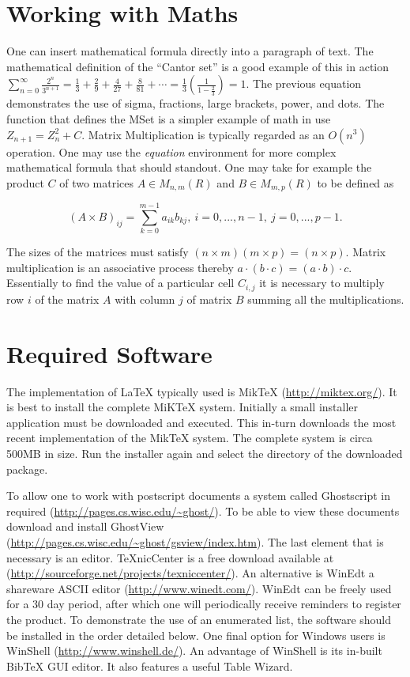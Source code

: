 \section{Working with Maths}

One can insert mathematical formula directly into a paragraph of text. The mathematical definition of the ``Cantor set'' is a good example of this in action
$\displaystyle\sum_{n=0}^\infty \frac{2^n}{3^{n+1}} = \frac{1}{3} +
\frac{2}{9} + \frac{4}{27} + \frac{8}{81} + \cdots =
\frac{1}{3}\left(\frac{1}{1-\frac{2}{3}}\right) = 1$. The previous equation demonstrates the use of sigma, fractions, large brackets, power, and dots. The function that defines the MSet is a simpler example of math in use $Z_{n+1} =
Z_{n}^2 + C$. Matrix Multiplication is typically regarded as an $O(n^3)$
operation. One may use the \emph{equation} environment for more complex mathematical formula that should standout. One may take for example the product  $C$ of two matrices $A \in M_{n,m}(R)$ and $B \in
M_{m,p}(R)$ to be defined as

\begin{equation}
(A \times B)_{ij} = \sum_{k=0} ^{m-1} a_{ik}b_{kj},~
i=0,...,n-1,~j=0,...,p-1.
\end{equation}

The sizes of the matrices must satisfy $(n \times m)(m \times p) =
(n \times p)$. Matrix multiplication is an associative process
thereby $a\cdot(b \cdot c) = (a \cdot b) \cdot c$. Essentially to
find the value of a particular cell $C_{i,j}$ it is necessary to
multiply row $i$ of the matrix $A$ with column $j$ of matrix $B$
summing all the multiplications.

\section{Required Software}

The implementation of \LaTeX \hspace{2 pt} typically used is MikTeX (\url{http://miktex.org/}). It is best to install the complete MiKTeX  system. Initially a small installer application must be downloaded and executed. This in-turn downloads the most recent implementation of the MikTeX system. The complete system is circa 500MB in size. Run the installer again and select the directory of the downloaded package.

To allow one to work with postscript documents a system called Ghostscript in required (\url{http://pages.cs.wisc.edu/~ghost/}). To be able to view these documents download and install GhostView (\url{http://pages.cs.wisc.edu/~ghost/gsview/index.htm}). The last element that is necessary is an editor. TeXnicCenter is a free download available at (\url{http://sourceforge.net/projects/texniccenter/}). An alternative is WinEdt a shareware ASCII editor (\url{http://www.winedt.com/}). WinEdt can be freely used for a 30 day period, after which one will periodically receive reminders to register the product. To demonstrate the use of an enumerated list, the software should be installed in the order detailed below. One final option for Windows users is WinShell (\url{http://www.winshell.de/}). An advantage of WinShell is its in-built BibTeX GUI editor. It also features a useful Table Wizard.

